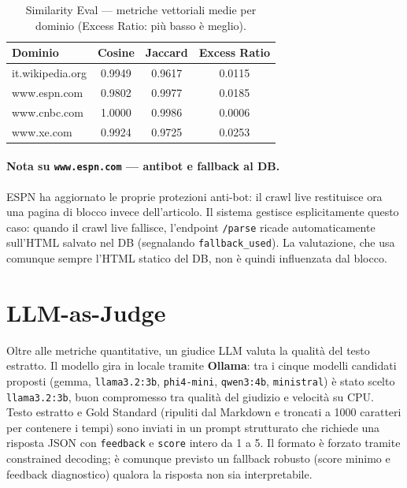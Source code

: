 \documentclass[11pt]{article}
\begin{document}
\begin{table}[h]
\centering
\small
\begin{tabular}{lccc}
\toprule
\textbf{Dominio} & \textbf{Cosine} & \textbf{Jaccard} & \textbf{Excess Ratio}\\
\midrule
it.wikipedia.org  & 0.9949 & 0.9617 & 0.0115 \\
www.espn.com      & 0.9802 & 0.9977 & 0.0185 \\
www.cnbc.com      & 1.0000 & 0.9986 & 0.0006 \\
www.xe.com        & 0.9924 & 0.9725 & 0.0253 \\
\bottomrule
\end{tabular}
\caption{Similarity Eval — metriche vettoriali medie per dominio (Excess Ratio: più basso è meglio).}
\end{table}

\paragraph{Nota su \texttt{www.espn.com} — antibot e fallback al DB.} ESPN ha aggiornato le proprie protezioni anti-bot: il crawl live restituisce ora una pagina di blocco invece dell'articolo. Il sistema gestisce esplicitamente questo caso: quando il crawl live fallisce, l'endpoint \texttt{/parse} ricade automaticamente sull'HTML salvato nel DB (segnalando \texttt{fallback\_used}). La valutazione, che usa comunque sempre l'HTML statico del DB, non è quindi influenzata dal blocco.


\section{LLM-as-Judge}

Oltre alle metriche quantitative, un giudice LLM valuta la qualità del testo estratto. Il modello gira in locale tramite \textbf{Ollama}: tra i cinque modelli candidati proposti (gemma, \texttt{llama3.2:3b}, \texttt{phi4-mini}, \texttt{qwen3:4b}, \texttt{ministral}) è stato scelto \texttt{llama3.2:3b}, buon compromesso tra qualità del giudizio e velocità su CPU. Testo estratto e Gold Standard (ripuliti dal Markdown e troncati a 1000 caratteri per contenere i tempi) sono inviati in un prompt strutturato che richiede una risposta JSON con \texttt{feedback} e \texttt{score} intero da 1 a 5. Il formato è forzato tramite constrained decoding; è comunque previsto un fallback robusto (score minimo e feedback diagnostico) qualora la risposta non sia interpretabile.
\end{document}
